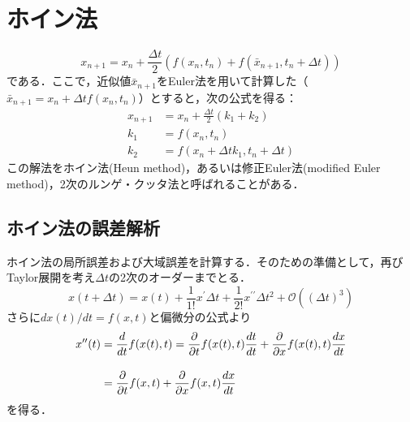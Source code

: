 \documentclass[12pt]{jsarticle}\usepackage{ifthen}\newboolean{enlarge}\setboolean{enlarge}{false}
\newcommand{\nn}{\notag \\}
\begin{document}
\section{ホイン法}
\begin{equation}
	x_{n+1}=x_n+\frac{\Delta t}{2}\left(
	f(x_n,t_n)
	+f(\bar{x}_{n+1},t_{n}+\Delta t)
	\right)
\end{equation}
である．ここで，近似値$\bar{x}_{n+1}$をEuler法を用いて計算した（$\bar{x}_{n+1}=x_n+\Delta t f(x_n,t_n)$）とすると，次の公式を得る：
\begin{align}\label{Heun}
	x_{n+1}&=x_n+\frac{\Delta t}{2}(k_1+k_2)\\[10pt]
	k_1&=f(x_n,t_n)\\[10pt]
	k_2&=f(x_n+\Delta t k_1, t_n + \Delta t)
\end{align}
この解法をホイン法(Heun method)，あるいは修正Euler法(modified Euler method)，2次のルンゲ・クッタ法と呼ばれることがある．

\subsection{ホイン法の誤差解析}
ホイン法の局所誤差および大域誤差を計算する．そのための準備として，再びTaylor展開を考え$\Delta t$の2次のオーダーまでとる．
\begin{equation}
	x(t+\Delta t)=x(t) +\frac{1}{1!}x^{\prime}\Delta t +\frac{1}{2!}x^{\prime\prime}\Delta t^2+\mathcal{O}((\Delta t)^3)
\end{equation}
さらに$dx(t)/dt=f(x,t)$と偏微分の公式より
\begin{align}\label{P}
	x^{\prime\prime}(t)&=\frac{d}{dt}f(x(t),t)
	=\frac{\partial }{\partial t}f(x(t),t)\frac{dt}{dt}+\frac{\partial }{\partial x}f(x(t),t)\frac{dx}{dt}\nn[10pt]
	&=\frac{\partial }{\partial t}f(x,t)+\frac{\partial }{\partial x}f(x,t)\frac{dx}{dt}
\end{align}
を得る．
\end{document}
